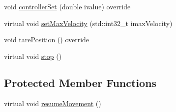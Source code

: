 \begin{DoxyCompactItemize}
\item 
void \mbox{\hyperlink{classokapi_1_1AsyncPosIntegratedController_aaa8d694c814e7b419dfb55b3e3a1d72e}{controller\+Set}} (double ivalue) override
\item 
virtual void \mbox{\hyperlink{classokapi_1_1AsyncPosIntegratedController_a4e92e8c03b5e24cb60575fa508eb6c31}{set\+Max\+Velocity}} (std\+::int32\+\_\+t imax\+Velocity)
\item 
void \mbox{\hyperlink{classokapi_1_1AsyncPosIntegratedController_a5fa801adbb46287423c5baae82f75924}{tare\+Position}} () override
\item 
virtual void \mbox{\hyperlink{classokapi_1_1AsyncPosIntegratedController_a22fdea35f8d56d81496dcf191f0c2852}{stop}} ()
\end{DoxyCompactItemize}
\subsection*{Protected Member Functions}
\begin{DoxyCompactItemize}
\item 
virtual void \mbox{\hyperlink{classokapi_1_1AsyncPosIntegratedController_aacdf10d9717b1e02c3df095c8bb95fb0}{resume\+Movement}} ()
\end{DoxyCompactItemize}
